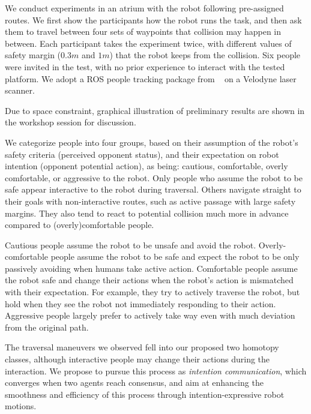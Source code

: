 \documentclass[conference]{IEEEtran}
\begin{document}
We conduct experiments in an atrium with the robot following pre-assigned 
routes. We first show the participants how the robot runs the task, and then 
ask them to travel between four sets of waypoints that collision may happen in 
between. Each participant takes the experiment twice, with different values of 
safety margin ($0.3m$ and $1m$) that the robot keeps from the collision. Six 
people were invited in the test, with no prior experience to interact with the 
tested platform. We adopt a ROS people tracking package from ~\cite{leigh2015person}
on a Velodyne laser scanner. 

Due to space constraint, graphical illustration of preliminary results are 
shown in the workshop session for discussion. 

We categorize people into four groups, based on their assumption of the 
robot's safety criteria (perceived opponent status), and their expectation on 
robot intention (opponent potential action), as being: cautious, comfortable, 
overly comfortable, or aggressive to the robot. Only people who assume the 
robot to be safe appear interactive to the robot during traversal. Others 
navigate straight to their goals with non-interactive routes, such as active 
passage with large safety margins. They also tend to react to potential 
collision much more in advance compared to (overly)comfortable people. 

Cautious people assume the robot to be unsafe and avoid the robot. Overly-comfortable 
people assume the robot to be safe and expect the robot to be only passively avoiding when 
humans take active action. Comfortable people assume the robot safe and change 
their actions when the robot's action is mismatched with their expectation. 
For example, they try to actively traverse the robot, but hold when they see 
the robot not immediately responding to their action. Aggressive people 
largely prefer to actively take way even with much deviation from the original path. 

The traversal maneuvers we observed fell into our proposed two homotopy 
classes, although interactive people may change their actions during the 
interaction. We propose to pursue this process as \textit{intention communication}, 
which converges when two agents reach consensus, and aim at enhancing the 
smoothness and efficiency of this process through intention-expressive robot 
motions.
\end{document}
